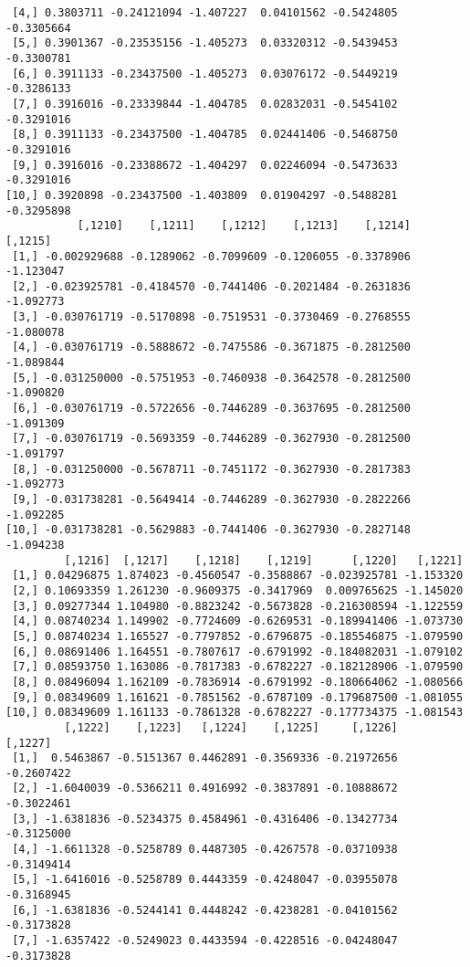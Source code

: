 \documentclass[
  letterpaper,
  DIV=11,
  numbers=noendperiod]{scrreprt}
\begin{document}
\begin{verbatim}
 [4,] 0.3803711 -0.24121094 -1.407227  0.04101562 -0.5424805 -0.3305664
 [5,] 0.3901367 -0.23535156 -1.405273  0.03320312 -0.5439453 -0.3300781
 [6,] 0.3911133 -0.23437500 -1.405273  0.03076172 -0.5449219 -0.3286133
 [7,] 0.3916016 -0.23339844 -1.404785  0.02832031 -0.5454102 -0.3291016
 [8,] 0.3911133 -0.23437500 -1.404785  0.02441406 -0.5468750 -0.3291016
 [9,] 0.3916016 -0.23388672 -1.404297  0.02246094 -0.5473633 -0.3291016
[10,] 0.3920898 -0.23437500 -1.403809  0.01904297 -0.5488281 -0.3295898
           [,1210]    [,1211]    [,1212]    [,1213]    [,1214]   [,1215]
 [1,] -0.002929688 -0.1289062 -0.7099609 -0.1206055 -0.3378906 -1.123047
 [2,] -0.023925781 -0.4184570 -0.7441406 -0.2021484 -0.2631836 -1.092773
 [3,] -0.030761719 -0.5170898 -0.7519531 -0.3730469 -0.2768555 -1.080078
 [4,] -0.030761719 -0.5888672 -0.7475586 -0.3671875 -0.2812500 -1.089844
 [5,] -0.031250000 -0.5751953 -0.7460938 -0.3642578 -0.2812500 -1.090820
 [6,] -0.030761719 -0.5722656 -0.7446289 -0.3637695 -0.2812500 -1.091309
 [7,] -0.030761719 -0.5693359 -0.7446289 -0.3627930 -0.2812500 -1.091797
 [8,] -0.031250000 -0.5678711 -0.7451172 -0.3627930 -0.2817383 -1.092773
 [9,] -0.031738281 -0.5649414 -0.7446289 -0.3627930 -0.2822266 -1.092285
[10,] -0.031738281 -0.5629883 -0.7441406 -0.3627930 -0.2827148 -1.094238
         [,1216]  [,1217]    [,1218]    [,1219]      [,1220]   [,1221]
 [1,] 0.04296875 1.874023 -0.4560547 -0.3588867 -0.023925781 -1.153320
 [2,] 0.10693359 1.261230 -0.9609375 -0.3417969  0.009765625 -1.145020
 [3,] 0.09277344 1.104980 -0.8823242 -0.5673828 -0.216308594 -1.122559
 [4,] 0.08740234 1.149902 -0.7724609 -0.6269531 -0.189941406 -1.073730
 [5,] 0.08740234 1.165527 -0.7797852 -0.6796875 -0.185546875 -1.079590
 [6,] 0.08691406 1.164551 -0.7807617 -0.6791992 -0.184082031 -1.079102
 [7,] 0.08593750 1.163086 -0.7817383 -0.6782227 -0.182128906 -1.079590
 [8,] 0.08496094 1.162109 -0.7836914 -0.6791992 -0.180664062 -1.080566
 [9,] 0.08349609 1.161621 -0.7851562 -0.6787109 -0.179687500 -1.081055
[10,] 0.08349609 1.161133 -0.7861328 -0.6782227 -0.177734375 -1.081543
         [,1222]    [,1223]   [,1224]    [,1225]     [,1226]    [,1227]
 [1,]  0.5463867 -0.5151367 0.4462891 -0.3569336 -0.21972656 -0.2607422
 [2,] -1.6040039 -0.5366211 0.4916992 -0.3837891 -0.10888672 -0.3022461
 [3,] -1.6381836 -0.5234375 0.4584961 -0.4316406 -0.13427734 -0.3125000
 [4,] -1.6611328 -0.5258789 0.4487305 -0.4267578 -0.03710938 -0.3149414
 [5,] -1.6416016 -0.5258789 0.4443359 -0.4248047 -0.03955078 -0.3168945
 [6,] -1.6381836 -0.5244141 0.4448242 -0.4238281 -0.04101562 -0.3173828
 [7,] -1.6357422 -0.5249023 0.4433594 -0.4228516 -0.04248047 -0.3173828

\end{verbatim}
\end{document}
